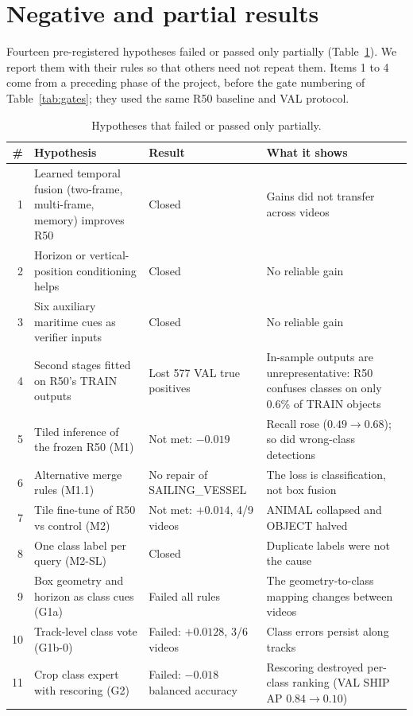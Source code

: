 \section{Negative and partial results}\label{sec:negative}

Fourteen pre-registered hypotheses failed or passed only partially (Table~\ref{tab:negative}). We report them with their rules so that others need not repeat them. Items 1 to 4 come from a preceding phase of the project, before the gate numbering of Table~\ref{tab:gates}; they used the same R50 baseline and VAL protocol. 

\begin{table}[t]
\centering
\caption{Hypotheses that failed or passed only partially.}
\label{tab:negative}
\small
\begin{tabular}{rp{4.0cm}p{2.8cm}p{4.9cm}}
\toprule
\# & Hypothesis & Result & What it shows \\
\midrule
1 & Learned temporal fusion (two-frame, multi-frame, memory) improves R50 & Closed & Gains did not transfer across videos \\
2 & Horizon or vertical-position conditioning helps & Closed & No reliable gain \\
3 & Six auxiliary maritime cues as verifier inputs & Closed & No reliable gain \\
4 & Second stages fitted on R50's TRAIN outputs & Lost 577 VAL true positives & In-sample outputs are unrepresentative: R50 confuses classes on only 0.6\% of TRAIN objects \\
5 & Tiled inference of the frozen R50 (M1) & Not met: $-0.019$ & Recall rose ($0.49 \rightarrow 0.68$); so did wrong-class detections \\
6 & Alternative merge rules (M1.1) & No repair of SAILING\_VESSEL & The loss is classification, not box fusion \\
7 & Tile fine-tune of R50 vs control (M2) & Not met: $+0.014$, 4/9 videos & ANIMAL collapsed and OBJECT halved \\
8 & One class label per query (M2-SL) & Closed & Duplicate labels were not the cause \\
9 & Box geometry and horizon as class cues (G1a) & Failed all rules & The geometry-to-class mapping changes between videos \\
10 & Track-level class vote (G1b-0) & Failed: $+0.0128$, 3/6 videos & Class errors persist along tracks \\
11 & Crop class expert with rescoring (G2) & Failed: $-0.018$ balanced accuracy & Rescoring destroyed per-class ranking (VAL SHIP AP $0.84 \rightarrow 0.10$) \\

\end{tabular}
\end{table}
